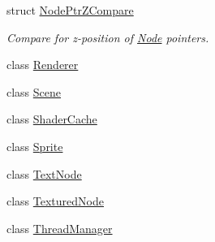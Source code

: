 \begin{DoxyCompactItemize}
struct \mbox{\hyperlink{structsage_1_1NodePtrZCompare}{Node\+Ptr\+Z\+Compare}}
\begin{DoxyCompactList}\small\item\em Compare for z-\/position of \mbox{\hyperlink{classsage_1_1Node}{Node}} pointers. \end{DoxyCompactList}\item 
class \mbox{\hyperlink{classsage_1_1Renderer}{Renderer}}
\item 
class \mbox{\hyperlink{classsage_1_1Scene}{Scene}}
\item 
class \mbox{\hyperlink{classsage_1_1ShaderCache}{Shader\+Cache}}
\item 
class \mbox{\hyperlink{classsage_1_1Sprite}{Sprite}}
\item 
class \mbox{\hyperlink{classsage_1_1TextNode}{Text\+Node}}
\item 
class \mbox{\hyperlink{classsage_1_1TexturedNode}{Textured\+Node}}
\item 
class \mbox{\hyperlink{classsage_1_1ThreadManager}{Thread\+Manager}}
\end{DoxyCompactItemize}

